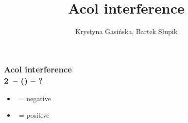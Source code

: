 \documentclass[12pt, a4paper]{article}
\title{Acol interference}
\author{Krystyna Gasińska, Bartek Słupik}
\begin{document}
\maketitle


\subsubsection*{Acol interference\\
                2\clubs\ -- () -- ?}
\begin{itemize}
    \item \dbl\ = negative
    \item \pass\ = positive
\end{itemize}

\end{document}
